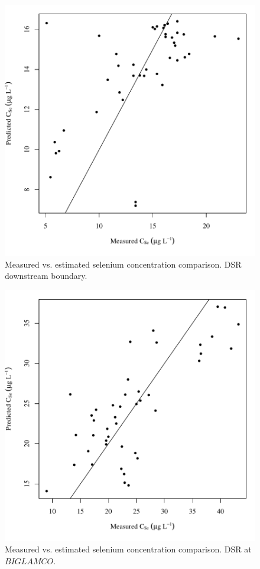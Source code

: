 \begin{figure}[htbp]
	\begin{center}
	\includegraphics[width=6in]{"Figures/Results_DSR/Conc Model pred v meas D106C"}
	\caption{Measured vs. estimated selenium concentration comparison.  DSR downstream boundary.}
	\end{center}
\end{figure}
\newpage

\begin{figure}[htbp]
	\begin{center}
	\includegraphics[width=6in]{"Figures/Results_DSR/Conc Model pred v meas BIG"}
	\caption{Measured vs. estimated selenium concentration comparison.  DSR at $BIGLAMCO$.}
	\end{center}
\end{figure}
\newpage

